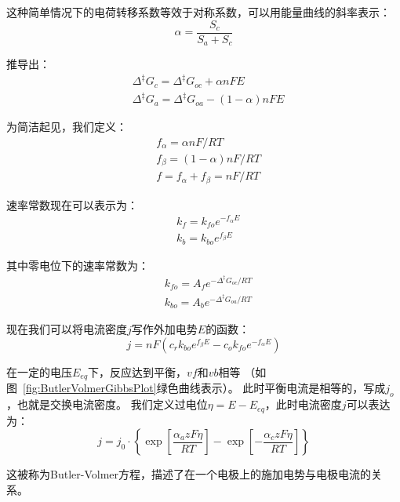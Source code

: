 这种简单情况下的电荷转移系数等效于对称系数，可以用能量曲线的斜率表示：
\begin{equation}
    \alpha=\frac{S_ {c}}{S_ {a} + S_ {c}}
\end{equation}

推导出：
\begin{equation}
    \begin{aligned}
        &\Delta ^{\ddagger }G_{c}=\Delta ^{\ddagger }G_{oc}+\alpha nFE\\
        &\Delta ^{\ddagger }G_{a}=\Delta ^{\ddagger }G_{oa}-(1-\alpha )nFE
    \end{aligned}
\end{equation}

为简洁起见，我们定义：
\begin{equation}
    \begin{aligned}
        &f_{\alpha }=\alpha nF/RT\\
        &f_{\beta }=(1-\alpha )nF/RT\\
        &f=f_{\alpha }+f_{\beta }=nF/RT
    \end{aligned}
\end{equation}

速率常数现在可以表示为：
\begin{equation}
    \begin{aligned}
        &k_{f}=k_{fo}e^{-f_{\alpha }E}\\
        &k_{b}=k_{bo}e^{f_{\beta }E}
    \end{aligned}
\end{equation}

其中零电位下的速率常数为：
\begin{equation}
    \begin{aligned}
        &k_{fo}=A_{f}e^{-\Delta ^{\ddagger }G_{oc}/RT}\\
        &k_{bo}=A_{b}e^{-\Delta ^{\ddagger }G_{oa}/RT}
    \end{aligned}
\end{equation}

现在我们可以将电流密度$j$写作外加电势$E$的函数\cite{CITEREFNewmanThomas-Alyea2004}：
\begin{equation}
    j=nF(c_{r}k_{bo}e^{f_{\beta }E}-c_{o}k_{fo}e^{-f_{\alpha }E})
\end{equation}

在一定的电压$E_{eq}$下，反应达到平衡，$vf$和$vb$相等
（如图~\ref{fig:ButlerVolmerGibbsPlot}绿色曲线表示）。
此时平衡电流是相等的，写成$j_o$，也就是交换电流密度。
我们定义过电位$\eta=E-E_ {eq}$，此时电流密度$j$可以表达为：
\begin{equation}
    j=j_{0}\cdot \left\{\exp \left[{\frac {\alpha _{a}zF\eta }{RT}}\right]-\exp \left[-{\frac {\alpha _{c}zF\eta }{RT}}\right]\right\}
    \label{equation:Butler_Volmer}
\end{equation}

这被称为Butler-Volmer方程，描述了在一个电极上的施加电势与电极电流的关系。